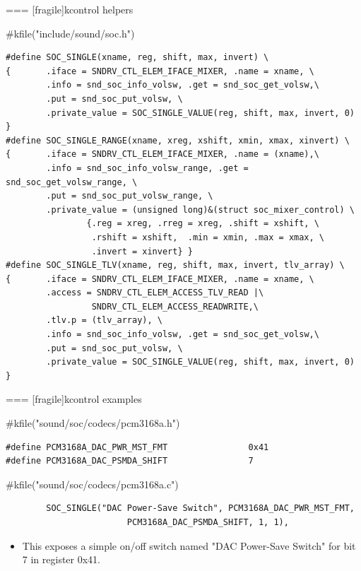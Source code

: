 === [fragile]{kcontrol helpers}
  \begin{block}{#kfile("include/sound/soc.h")}
    \fontsize{9}{9}\selectfont
    \begin{verbatim}
#define SOC_SINGLE(xname, reg, shift, max, invert) \
{       .iface = SNDRV_CTL_ELEM_IFACE_MIXER, .name = xname, \
        .info = snd_soc_info_volsw, .get = snd_soc_get_volsw,\
        .put = snd_soc_put_volsw, \
        .private_value = SOC_SINGLE_VALUE(reg, shift, max, invert, 0) }
#define SOC_SINGLE_RANGE(xname, xreg, xshift, xmin, xmax, xinvert) \
{       .iface = SNDRV_CTL_ELEM_IFACE_MIXER, .name = (xname),\
        .info = snd_soc_info_volsw_range, .get = snd_soc_get_volsw_range, \
        .put = snd_soc_put_volsw_range, \
        .private_value = (unsigned long)&(struct soc_mixer_control) \
                {.reg = xreg, .rreg = xreg, .shift = xshift, \
                 .rshift = xshift,  .min = xmin, .max = xmax, \
                 .invert = xinvert} }
#define SOC_SINGLE_TLV(xname, reg, shift, max, invert, tlv_array) \
{       .iface = SNDRV_CTL_ELEM_IFACE_MIXER, .name = xname, \
        .access = SNDRV_CTL_ELEM_ACCESS_TLV_READ |\
                 SNDRV_CTL_ELEM_ACCESS_READWRITE,\
        .tlv.p = (tlv_array), \
        .info = snd_soc_info_volsw, .get = snd_soc_get_volsw,\
        .put = snd_soc_put_volsw, \
        .private_value = SOC_SINGLE_VALUE(reg, shift, max, invert, 0) }
    \end{verbatim}
  \end{block}


=== [fragile]{kcontrol examples}
  \begin{block}{#kfile("sound/soc/codecs/pcm3168a.h")}
    \fontsize{9}{9}\selectfont
    \begin{verbatim}
#define PCM3168A_DAC_PWR_MST_FMT                0x41
#define PCM3168A_DAC_PSMDA_SHIFT                7
    \end{verbatim}
  \end{block}
  \begin{block}{#kfile("sound/soc/codecs/pcm3168a.c")}
    \fontsize{9}{9}\selectfont
    \begin{verbatim}
        SOC_SINGLE("DAC Power-Save Switch", PCM3168A_DAC_PWR_MST_FMT,
                        PCM3168A_DAC_PSMDA_SHIFT, 1, 1),
    \end{verbatim}
  \end{block}
  \begin{itemize}
  \item This exposes a simple on/off switch named "DAC Power-Save
    Switch" for bit 7 in register 0x41.
  \end{itemize}


